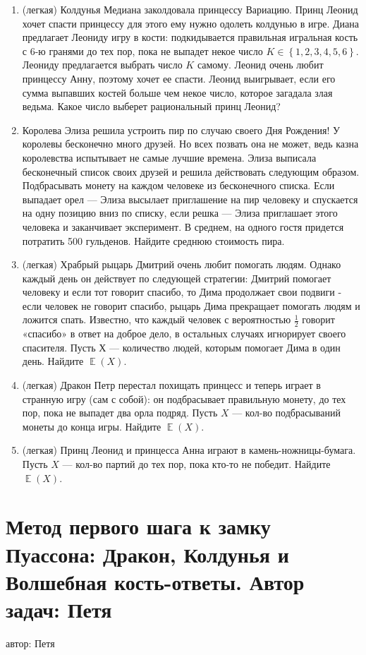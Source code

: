 \documentclass[a4paper,12pt]{article}
\DeclareMathOperator{\E}{\mathbb{E}}
\begin{document}
\begin{enumerate} %
\item (легкая) Колдунья Медиана заколдовала принцессу Вариацию. Принц Леонид хочет спасти принцессу для этого ему нужно одолеть колдунью в игре. Диана предлагает Леониду игру в кости: подкидывается правильная игральная кость с 6-ю гранями до тех пор, пока не выпадет некое число $K \in \left\{1,2,3,4,5,6 \right\}$. Леониду предлагается выбрать число $K$ самому. Леонид очень любит принцессу Анну, поэтому хочет ее спасти. Леонид выигрывает, если его сумма выпавших костей больше чем некое число, которое загадала злая ведьма. Какое число выберет рациональный принц Леонид?
\item
Королева Элиза решила устроить пир по случаю своего Дня Рождения!
У королевы бесконечно много друзей. Но всех позвать она не может,
ведь казна королевства испытывает не самые лучшие времена.
Элиза выписала бесконечный список своих друзей и решила действовать следующим образом.
Подбрасывать монету на каждом человеке из бесконечного списка.
Если выпадает орел — Элиза высылает приглашение на пир человеку и спускается на одну позицию вниз по списку,
если решка — Элиза приглашает этого человека и заканчивает эксперимент.
В среднем, на одного гостя придется потратить 500 гульденов.  Найдите среднюю стоимость пира.
\item (легкая)
Храбрый рыцарь Дмитрий очень любит помогать людям. Однако каждый день он действует по следующей стратегии: Дмитрий помогает человеку и если тот говорит спасибо, то Дима продолжает свои подвиги - если человек не говорит спасибо, рыцарь Дима прекращает помогать людям и ложится спать. Известно, что каждый человек с вероятностью $\frac{1}{2}$ говорит «спасибо» в ответ на доброе дело, в остальных случаях игнорирует своего спасителя. Пусть $Х$ — количество людей, которым помогает Дима в один день. Найдите $\E(X)$.
\item (легкая) Дракон Петр перестал похищать принцесс и теперь играет в странную игру (сам с собой): он подбрасывает правильную монету, до тех пор, пока не выпадет два орла подряд. Пусть $X$ — кол-во подбрасываний монеты до конца игры. Найдите $\E(X)$.
\item (легкая) Принц Леонид и принцесса Анна играют в камень-ножницы-бумага.
Пусть $X$ — кол-во партий до тех пор, пока кто-то не победит. Найдите $\E(X)$.
\end{enumerate}

\newpage
\section{Метод первого шага к замку Пуассона: Дракон, Колдунья и Волшебная кость-ответы. Автор задач: Петя}
автор: Петя
\end{document}
